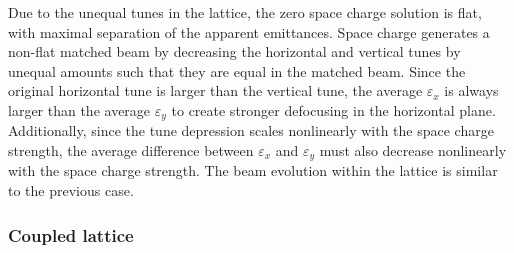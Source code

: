 %
Due to the unequal tunes in the lattice, the zero space charge solution is flat, with maximal separation of the apparent emittances. Space charge generates a non-flat matched beam by decreasing the horizontal and vertical tunes by unequal amounts such that they are equal in the matched beam. Since the original horizontal tune is larger than the vertical tune, the average $\varepsilon_x$ is always larger than the average $\varepsilon_y$ to create stronger defocusing in the horizontal plane. Additionally, since the tune depression scales nonlinearly with the space charge strength, the average difference between $\varepsilon_x$ and $\varepsilon_y$ must also decrease nonlinearly with the space charge strength. The beam evolution within the lattice is similar to the previous case.


\subsubsection{Coupled lattice}

